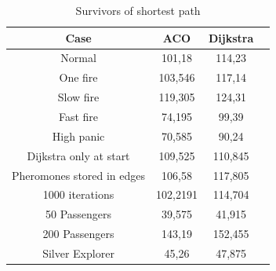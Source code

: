 \begin{table}[ht]
\caption{Survivors of shortest path} 				%
\centering										%
\begin{tabular}{c c c c}						%
\hline
\hline 											%
Case & ACO & Dijkstra \\[0.5ex]%
\hline											%
Normal & 101,18 & 114,23 \\							%
One fire & 103,546 & 117,14 \\
Slow fire & 119,305 & 124,31 \\
Fast fire & 74,195 & 99,39 \\
High panic & 70,585 & 90,24 \\
Dijkstra only at start & 109,525 & 110,845 \\
Pheromones stored in edges & 106,58 & 117,805 \\
1000 iterations & 102,2191 & 114,704 \\
50 Passengers & 39,575 & 41,915 \\ 
200 Passengers & 143,19 & 152,455 \\
Silver Explorer & 45,26 & 47,875 \\ [1ex]						%
\hline														%

\end{tabular}
\label{table:tableShortest}								
\end{table}